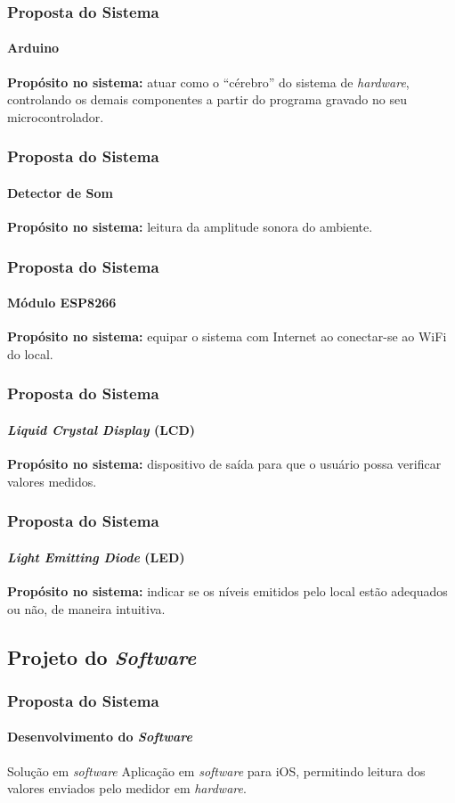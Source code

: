 \documentclass[brazil]{beamer}
\begin{document}
	\begin{frame}
		\frametitle{Proposta do Sistema}
		\framesubtitle{Arduino}
	  	\footnotesize{{\bf Propósito no sistema:} atuar como o ``cérebro'' do sistema de {\it hardware}, controlando os demais componentes a partir do programa gravado no seu microcontrolador.}
	\end{frame}

	\begin{frame}
		\frametitle{Proposta do Sistema}
		\framesubtitle{Detector de Som}
	  	{\bf Propósito no sistema:} leitura da amplitude sonora do ambiente.
	\end{frame}

	\begin{frame}
		\frametitle{Proposta do Sistema}
		\framesubtitle{Módulo ESP8266}
	  	{\bf Propósito no sistema:} equipar o sistema com Internet ao conectar-se ao WiFi do local.
	\end{frame}

	\begin{frame}
		\frametitle{Proposta do Sistema}
		\framesubtitle{{\it Liquid Crystal Display} (LCD)}
	  	{\bf Propósito no sistema:} dispositivo de saída para que o usuário possa verificar valores medidos.
	\end{frame}

	\begin{frame}
		\frametitle{Proposta do Sistema}
		\framesubtitle{{\it Light Emitting Diode} (LED)}
	  	{\bf Propósito no sistema:} indicar se os níveis emitidos pelo local estão adequados ou não, de maneira intuitiva.
	\end{frame}

	\subsection{Projeto do {\it Software}}

	\begin{frame}
		\frametitle{Proposta do Sistema}
		\framesubtitle{Desenvolvimento do \textit{Software}}
		\vspace{0.5cm}
		\begin{block}{\small{Solução em {\it software}}}
				\small{Aplicação em {\it software} para iOS, permitindo leitura dos valores enviados pelo medidor em {\it hardware}.}
			\end{block}
	\end{frame}
\end{document}
